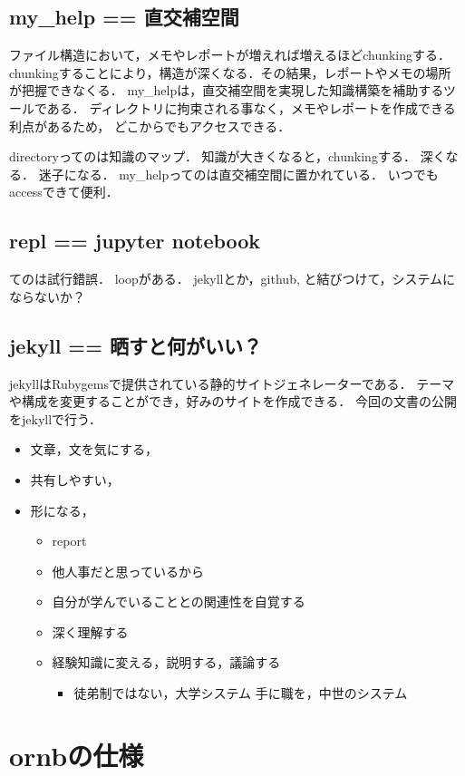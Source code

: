 \documentclass[a4,p11]{article}
\begin{document}
\subsection{my\_help == 直交補空間}
\label{sec:orgcda925f}
ファイル構造において，メモやレポートが増えれば増えるほどchunkingする．
chunkingすることにより，構造が深くなる．その結果，レポートやメモの場所
が把握できなくる．
my\_helpは，直交補空間を実現した知識構築を補助するツールである．
ディレクトリに拘束される事なく，メモやレポートを作成できる利点があるため，
どこからでもアクセスできる．



directoryってのは知識のマップ．
知識が大きくなると，chunkingする．
深くなる．
迷子になる．
my\_helpってのは直交補空間に置かれている．
いつでもaccessできて便利．

\subsection{repl == jupyter notebook}
\label{sec:orgf47e0d9}
てのは試行錯誤．
loopがある．
jekyllとか，github, と結びつけて，システムにならないか？

\subsection{jekyll == 晒すと何がいい？}
\label{sec:org2b94e84}
jekyllはRubygemsで提供されている静的サイトジェネレーターである．
テーマや構成を変更することができ，好みのサイトを作成できる．
今回の文書の公開をjekyllで行う．
\begin{itemize}
\item 文章，文を気にする，
\item 共有しやすい，
\item 形になる，
\begin{itemize}
\item report
\item 他人事だと思っているから
\item 自分が学んでいることとの関連性を自覚する
\item 深く理解する
\item 経験知識に変える，説明する，議論する
\begin{itemize}
\item 徒弟制ではない，大学システム
手に職を，中世のシステム
\end{itemize}
\end{itemize}
\end{itemize}

\section{ornbの仕様}
\label{sec:orgafbddd0}
\end{document}
